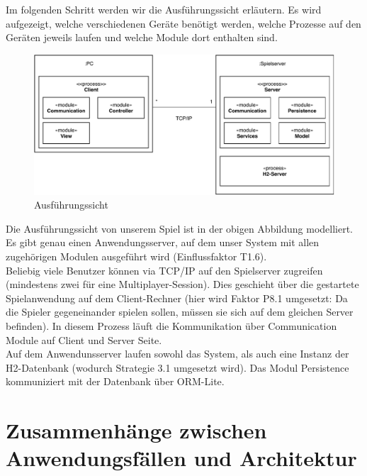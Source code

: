 \documentclass[fontsize=12pt,paper=a4,twoside]{scrartcl}
\begin{document}
Im folgenden Schritt werden wir die Ausführungssicht erläutern. Es wird aufgezeigt, welche verschiedenen Geräte benötigt werden, welche Prozesse auf den Geräten jeweils laufen und welche Module dort enthalten sind. \\

\begin{figure}[H]
\includegraphics[width=\textwidth]{UML/Ausfuehrungssicht.pdf}
 \caption{Ausführungssicht}
\end{figure}

Die Ausführungssicht von unserem Spiel ist in der obigen Abbildung modelliert. Es gibt genau einen Anwendungsserver, auf dem unser System mit allen zugehörigen Modulen ausgeführt wird (Einflussfaktor T1.6). \\

Beliebig viele Benutzer können via TCP/IP auf den Spielserver zugreifen (mindestens zwei für eine Multiplayer-Session). Dies geschieht über die gestartete Spielanwendung auf dem Client-Rechner (hier wird Faktor P8.1 umgesetzt: Da die Spieler gegeneinander spielen sollen, müssen sie sich auf dem gleichen Server befinden). In diesem Prozess läuft die Kommunikation über Communication Module auf Client und Server Seite. \\

Auf dem Anwendunsserver laufen sowohl das System, als auch eine Instanz der H2-Datenbank (wodurch Strategie 3.1 umgesetzt wird).
Das Modul Persistence kommuniziert mit der Datenbank über ORM-Lite.  \\ 





\section{Zusammenhänge zwischen Anwendungsfällen und Architektur}
 \label{sec:anwendungsfaelle}
\end{document}
